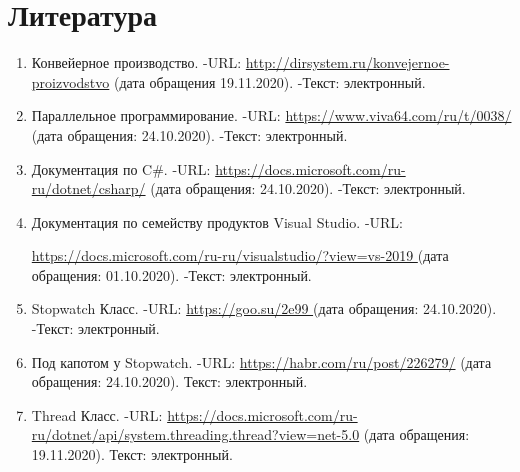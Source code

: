 \documentclass[14pt, a4paper]{extarticle}
\begin{document}
\section*{Литература}
\begin{enumerate}
	\label{literature}
	\item Конвейерное производство. -URL: \href{http://dirsystem.ru/konvejernoe-proizvodstvo}{http://dirsystem.ru/konvejernoe-proizvodstvo} (дата обращения 19.11.2020). -Текст: электронный.
	\item Параллельное программирование. -URL: \href{https://www.viva64.com/ru/t/0038/}{https://www.viva64.com/ru/t/0038/} (дата обращения: 24.10.2020). -Текст: электронный.
	\item  Документация по C\#. -URL: \href{https://docs.microsoft.com/ru-ru/dotnet/csharp/}{https://docs.microsoft.com/ru-ru/dotnet/csharp/} (дата обращения: 24.10.2020). -Текст: электронный.
	\item Документация по семейству продуктов Visual Studio. -URL:\par \href{https://docs.microsoft.com/ru-ru/visualstudio/?view=vs-2019}{https://docs.microsoft.com/ru-ru/visualstudio/?view=vs-2019 } (дата обращения: 01.10.2020). -Текст: электронный.
	\item Stopwatch Класс. -URL: \href{https://goo.su/2e99}{https://goo.su/2e99 } (дата обращения: 24.10.2020). -Текст: электронный.
	\item Под капотом у Stopwatch. -URL:  \href{https://habr.com/ru/post/226279/}{https://habr.com/ru/post/226279/} (дата обращения: 24.10.2020). Текст: электронный.
	\item Thread Класс. -URL:  \href{https://docs.microsoft.com/ru-ru/dotnet/api/system.threading.thread?view=net-5.0}{https://docs.microsoft.com/ru-ru/dotnet/api/system.threading.thread?view=net-5.0} (дата обращения: 19.11.2020). Текст: электронный.
\end{enumerate}
\end{document}
